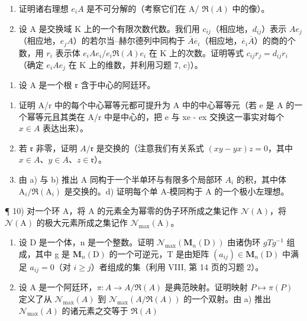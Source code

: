 \begin{enumerate}
\def\labelenumi{\alph{enumi})}
\setcounter{enumi}{1}
\item
  证明诸右理想 \(e_{i}A\) 是不可分解的（考察它们在 A/ \(\Re(A)\) 中的像）。
\item
  设 A 是交换域 K 上的一个有限次数代数。我们用 \(c_{ij}\)（相应地，\(d_{ij}\)）表示 \(Ae_{j}\)（相应地，\(e_{j}A\)）的若尔当–赫尔德列中同构于 \(\overline{A}\overline{e}_{i}\)（相应地，\(\overline{e}_{i}\overline{A}\)）的商的个数，用 \(r_{i}\) 表示体 \(e_{i}Ae_{i}/e_{i}\Re(A)e_{i}\) 在 K 上的次数。证明等式 \(c_{ij}r_{j}=d_{ij}r_{i}\)（确定 \(e_{i}Ae_{j}\) 在 K 上的维数，并利用习题 7, c)）。
\end{enumerate}

\begin{enumerate}
\def\labelenumi{\arabic{enumi})}
\setcounter{enumi}{8}
\tightlist
\item
  设 A 是一个根 \(\mathfrak{r}\) 含于中心的阿廷环。
\end{enumerate}

\begin{enumerate}
\def\labelenumi{\alph{enumi})}
\item
  证明 A/r 中的每个中心幂等元都可提升为 A 中的中心幂等元（若 e 是 A 的一个幂等元且其类在 A/r 中是中心的，把 e 与 xe - ex 交换这一事实对每个 \(x \in A\) 表达出来）。
\item
  若 \(\mathfrak{r}\) 非零，证明 \(A / \mathfrak{r}\) 是交换的（注意我们有关系式 \((xy - yx)z = 0\)，其中 \(x\in A\)、\(y\in A\)、\(z\in \mathfrak{r}\)）。
\item
  由 a) 与 b) 推出 A 同构于一个半单环与有限多个局部环 \(A_{i}\) 的积，其中体 \(\mathrm{A}_{i}/\Re(\mathrm{A}_{i})\) 是交换的。d) 证明每个单 A-模同构于 A 的一个极小左理想。
\end{enumerate}

¶ 10) 对一个环 A，将 A 的元素全为幂零的伪子环所成之集记作 \(\mathcal{N}(\mathrm{A})\)，将 \(\mathcal{N}(\mathrm{A})\) 的极大元素所成之集记作 \(\mathcal{N}_{\max}(\mathrm{A})\)。

\begin{enumerate}
\def\labelenumi{\alph{enumi})}
\tightlist
\item
  设 D 是一个体，n 是一个整数。证明 \(\mathcal{N}_{\max}(\mathbf{M}_{n}(\mathrm{D}))\) 由诸伪环 \(gTg^{-1}\) 组成，其中 g 是 \(\mathbf{M}_{n}(\mathrm{D})\) 的一个可逆元，T 是由矩阵 \((a_{ij})\in\mathbf{M}_{n}(\mathrm{D})\) 中满足 \(a_{ij}=0\)（对 \(i\geqslant j\)）者组成的集（利用 VIII, 第 14 页的习题 2）。
\item
  设 A 是一个阿廷环，\(\pi:A\to A/\Re(A)\) 是典范映射。证明映射 \(P\mapsto\pi(P)\) 定义了从 \(\mathcal{N}_{\max}(A)\) 到 \(\mathcal{N}_{\max}(A/\Re(A))\) 的一个双射。由 a) 推出 \(\mathcal{N}_{\max}(A)\) 的诸元素之交等于 \(\Re(A)\)
\end{enumerate}

